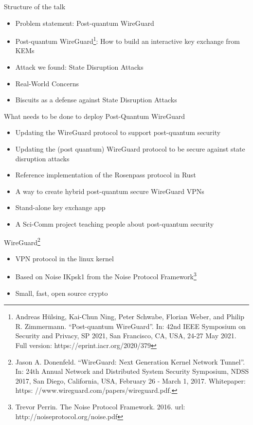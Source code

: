 \begin{frame}{Structure of the talk}
\begin{itemize}
  \item Problem statement: Post-quantum WireGuard %
  \item Post-quantum WireGuard\footnote{
      Andreas Hülsing, Kai-Chun Ning, Peter Schwabe, Florian Weber, and Philip R. Zimmermann. “Post-quantum WireGuard”. In: 42nd IEEE Symposium on Security and Privacy, SP 2021, San Francisco, CA, USA, 24-27 May 2021. Full version: https://eprint.iacr.org/2020/379
    }: How to build an interactive key exchange from KEMs %
  \item Attack we found: State Disruption Attacks %
  \item Real-World Concerns %
  \item Biscuits as a defense against State Disruption Attacks
\end{itemize}
\end{frame}

\begin{frame}{What needs to be done to deploy Post-Quantum WireGuard}
\begin{itemize}
    \item Updating the WireGuard protocol to support post-quantum security
    \item Updating the (post quantum) WireGuard protocol to be secure against state disruption attacks
    \item Reference implementation of the Rosenpass protocol in Rust
    \item A way to create hybrid post-quantum secure WireGuard VPNs
    \item Stand-alone key exchange app
    \item A Sci-Comm project teaching people about post-quantum security
\end{itemize}
\end{frame}

\begin{frame}{WireGuard\footnote{Jason A. Donenfeld. “WireGuard: Next Generation Kernel Network Tunnel”. In: 24th Annual Network and Distributed System Security Symposium, NDSS 2017, San Diego, California, USA, February 26 - March 1, 2017. Whitepaper: https: //www.wireguard.com/papers/wireguard.pdf.}}
\begin{itemize}
  \item VPN protocol in the linux kernel
  \item Based on Noise IKpsk1 from the Noise Protocol Framework\footnote{Trevor Perrin. The Noise Protocol Framework. 2016. url: http://noiseprotocol.org/noise.pdf}
  \item Small, fast, open source crypto
\end{itemize}
\end{frame}

